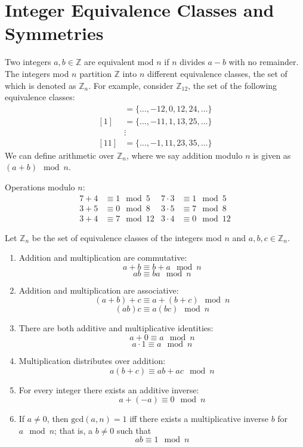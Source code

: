 \documentclass[12pt, letterpaper]{report}
\begin{document}
\section{Integer Equivalence Classes and Symmetries}
Two integers \(a,b\in\mathbb{Z} \) are equivalent mod \(n\) if \(n\) divides \(a-b\) with no remainder. The integers mod \(n\) partition \(\mathbb{Z} \) into \(n\) different equivalence classes, the set of which is denoted as \(\mathbb{Z} _n\). For example, consider \(\mathbb{Z} _{12}\), the set of the following equivalence classes:
\begin{align*}
	[0]&=\{ \ldots,-12,0,12,24,\ldots \}\\
	[1]&=\{ \ldots,-11,1,13,25,\ldots \}\\
	&\vdots\\
	[11]&=\{ \ldots,-1,11,23,35,\ldots \}
\end{align*}
We can define arithmetic over \(\mathbb{Z} _n\), where we say addition modulo \(n\) is given as \((a+b)\mod n\).
\begin{eg}
	Operations modulo \(n\):
	\begin{align*}
		7+4&\equiv 1\mod5&7\cdot3&\equiv 1\mod5\\
		3+5&\equiv 0\mod8&3\cdot5&\equiv 7\mod8\\
		3+4&\equiv 7\mod12&3\cdot4&\equiv0\mod12
	\end{align*}
\end{eg}
\begin{proposition}\label{prop.1}
	Let \(\mathbb{Z} _n\) be the set of equivalence classes of the integers mod \(n\) and \(a,b,c\in\mathbb{Z} _n\).
	\begin{enumerate}
		\item Addition and multiplication are commutative:
		\[
			a+b\equiv b+a\mod n
		\]
		\[
			ab\equiv ba\mod n
		\]
		\item Addition and multiplication are associative:
		\[
			(a+b)+c\equiv a+(b+c)\mod n
		\]
		\[
			(ab)c\equiv a(bc)\mod n
		\]
		\item There are both additive and multiplicative identities:
		\[
			a+0\equiv a\mod n
		\]
		\[
			a\cdot 1\equiv a\mod n
		\]
		\item Multiplication distributes over addition:
		\[
			a(b+c)\equiv ab+ac\mod n
		\]
		\item For every integer there exists an additive inverse:
		\[
			a+(-a)\equiv 0\mod n
		\]
		\item If \(a\neq 0\), then \(\text{gcd}(a,n)=1 \) iff there exists a multiplicative inverse \(b\) for \(a\mod n\); that is, a \(b\neq 0\) such that 
		\[
			ab\equiv 1\mod n
		\]
	\end{enumerate}
\end{proposition}
\end{document}
